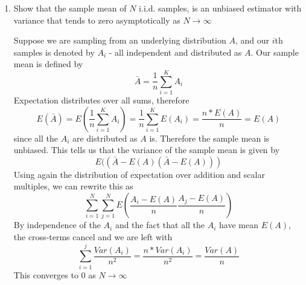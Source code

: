 \documentclass{article}
\newcommand{\chapternumber}{2}
\newenvironment{QandA}{\begin{enumerate}[label=\chapternumber.\arabic*]\bfseries\boldmath}
	{\end{enumerate}}
\newenvironment{answered}{\par\bigskip\normalfont\unboldmath}{}
\begin{document}
\begin{QandA}
\begin{answered}
		\[\frac{a_ia_j}{\bar{a}}\left(\frac{1}{\bar{a}+1}-\frac{1}{\bar{a}}\right)=-\frac{a_ia_j}{\bar{a}^2(\bar{a}+1)}\]
		If instead $i=j$, then define $d$ s.t. $d_k=a_k$ for $k\neq i$ and $d_i=a_i+2$. So our expression for the $i,i$th element becomes
		\[\frac{a_i(a_i+1)}{\bar{a}(\bar{a}+1)}\int_D\frac{\Gamma(\bar{d})}{\Gamma(d_1)...\Gamma(d_k)}\prod_{k=1}^Kx_k^{d_k-1}dx-\frac{a_i^2}{\bar{a}^2}\]
		As with the previous examples, the integral just evaluates to 1, so this simplifies to
		\[\frac{a_i}{\bar{a}(\bar{a}+1)}+\frac{a_i^2}{\bar{a}}\left(\frac{1}{\bar{a}+1}-\frac{1}{\bar{a}}\right)=\frac{\bar{a}a_i-a_i^2}{\bar{a}^2(\bar{a}+1)}\]
		When we consider this across all $i,j$, we get the proposed expression for covariance.
	\end{answered}
		
		
	\item Show that the sample mean of $N$ i.i.d. samples, is an unbiased estimator with variance that tends to zero asymptotically as $N\rightarrow\infty$
	\begin{answered}
		Suppose we are sampling from an underlying distribution $A$, and our $i$th samples is denoted by $A_i$ - all independent and distributed as $A$. Our sample mean is defined by
		\[\bar{A}=\frac{1}{n}\sum_{i=1}^{K}A_i\]
		Expectation distributes over all sums, therefore
		\[E(\bar{A})=E\left(\frac{1}{n}\sum_{i=1}^{K}A_i\right)=\frac{1}{n}\sum_{i=1}^{K}E(A_i)=\frac{n*E(A)}{n}=E(A)\]
		since all the $A_i$ are distributed as $A$ is. Therefore the sample mean is unbiased.
		This tells us that the variance of the sample mean is given by 
		\[E((\bar{A}-E(A)(\bar{A}-E(A)))\]
		Using again the distribution of expectation over addition and scalar multiples, we can rewrite this as
		\[\sum_{i=1}^N\sum_{j=1}^NE\left(\frac{A_i-E(A)}{n}\frac{A_j-E(A)}{n}\right)\]
		By independence of the $A_i$ and the fact that all the $A_i$ have mean $E(A)$, the cross-terms cancel and we are left with
		\[\sum_{i=1}^j\frac{Var(A_i)}{n^2}=\frac{n*Var(A_i)}{n^2} = \frac{Var(A)}{n}\]
		This converges to 0 as $N\rightarrow\infty$
	\end{answered}
	

\end{QandA}
\end{document}
